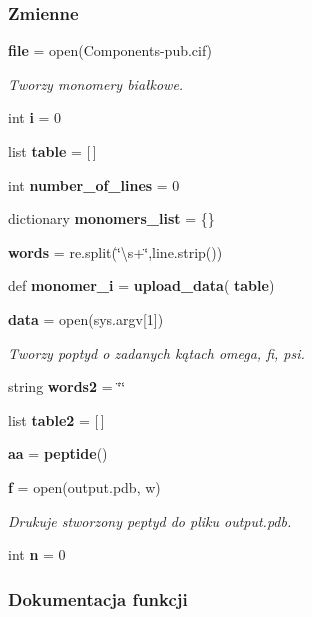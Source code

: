 \subsubsection*{Zmienne}
\begin{DoxyCompactItemize}
\item 
\textbf{ file} = open(\textquotesingle{}Components-\/pub.\+cif\textquotesingle{})
\begin{DoxyCompactList}\small\item\em Tworzy monomery białkowe. \end{DoxyCompactList}\item 
int \textbf{ i} = 0
\item 
list \textbf{ table} = [$\,$]
\item 
int \textbf{ number\+\_\+of\+\_\+lines} = 0
\item 
dictionary \textbf{ monomers\+\_\+list} = \{\}
\item 
\textbf{ words} = re.\+split(\char`\"{}\textbackslash{}s+\char`\"{},line.\+strip())
\item 
def \textbf{ monomer\+\_\+i} = \textbf{ upload\+\_\+data}(\textbf{ table})
\item 
\textbf{ data} = open(sys.\+argv[1])
\begin{DoxyCompactList}\small\item\em Tworzy poptyd o zadanych kątach omega, fi, psi. \end{DoxyCompactList}\item 
string \textbf{ words2} = \char`\"{}\char`\"{}
\item 
list \textbf{ table2} = [$\,$]
\item 
\textbf{ aa} = \textbf{ peptide}()
\item 
\textbf{ f} = open(\textquotesingle{}output.\+pdb\textquotesingle{}, \textquotesingle{}w\textquotesingle{})
\begin{DoxyCompactList}\small\item\em Drukuje stworzony peptyd do pliku output.\+pdb. \end{DoxyCompactList}\item 
int \textbf{ n} = 0
\end{DoxyCompactItemize}


\subsubsection{Dokumentacja funkcji}
\mbox{\label{namespaceprogram_a1a5eb7e0796234b56f3f8aaf1d224e91}} 
